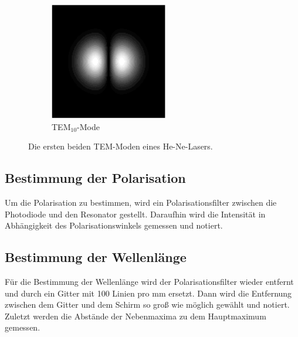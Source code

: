 \begin{figure}
\begin{subfigure}[c]{0.4\textwidth}
    \includegraphics[width=\textwidth]{Bilder/TEM10.png}
    \caption{TEM$_{10}$-Mode}
    \label{fig:TEM10}
  \end{subfigure}
  \caption{Die ersten beiden TEM-Moden eines He-Ne-Lasers. \cite{TEM}}
\end{figure}

\subsection{Bestimmung der Polarisation}
Um die Polarisation zu bestimmen, wird ein Polarisationsfilter zwischen die Photodiode und den Resonator gestellt. Daraufhin wird die Intensität in Abhängigkeit des Polarisationswinkels gemessen und notiert.

\subsection{Bestimmung der Wellenlänge}
Für die Bestimmung der Wellenlänge wird der Polarisationsfilter wieder entfernt und durch ein Gitter mit 100 Linien pro mm ersetzt. Dann wird die Entfernung zwischen dem Gitter und dem Schirm so groß wie möglich gewählt und notiert. Zuletzt werden die Abstände der Nebenmaxima zu dem Hauptmaximum gemessen.
